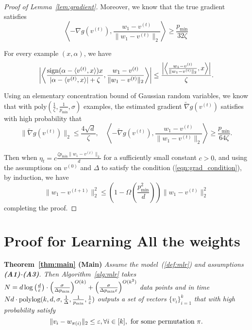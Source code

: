\begin{proof}[Proof of Lemma~\ref{lem:gradient}]
Moreover, we know that the true gradient satisfies
$$
  \left\langle - \nabla g(v^{(t)}) , \frac{ w_1 - v^{(t)}}{\| w_1 - v^{(t)}\|_2}  \right\rangle \geq \frac{p_{\min}}{32 \zeta} 
$$

For every example $(x, \alpha)$, we have
$$
  \left|\left\langle  \frac{\operatorname*{sign}(\alpha - \langle v^{(t)}, x \rangle) x }{|\alpha -  \langle v^{(t)}, x \rangle| + \zeta}   , \frac{ w_1 - v^{(t)}}{\| w_1 - v^{(t)}\|_2} \right\rangle \right|
	\leq 
	\frac{\left|\left\langle\frac{ w_1 - v^{(t)}}{\| w_1 - v^{(t)}\|_2}, x  \right\rangle\right|}{\zeta}.
$$

Using an elementary concentration bound of Gaussian random variables, we know that with $\text{poly}\left(\frac{1}{\zeta}, \frac{1}{p_{\min}}, \sigma\right)$ examples, the estimated gradient $\tilde{\nabla} g(v^{(t)})$ satisfies with high probability that
$$
  \| \tilde{\nabla } g(v^{(t)}) \|_2 \leq \frac{4 \sqrt{d}}{\zeta}, 
	\quad 
	\left\langle -\tilde{ \nabla} g(v^{(t)}) , \frac{ w_1 - v^{(t)}}{\| w_1 - v^{(t)}\|_2}  \right\rangle \geq \frac{p_{\min}}{64 \zeta}.
$$ 


Then when $\eta_t = c\frac{\zeta p_{\min} \| w_1 - v^{(t)}\|_2}{ d}$ for a sufficiently small constant $c>0$, and using the assumptions on $v^{(0)}$ and $\Delta$ to satisfy the condition (\ref{eqn:grad_condition}), by induction, we have
$$
 \| w_1 - v^{(t + 1)}\|_2^2 \leq \left( 1 - \Omega\left( \frac{p_{\min}^2}{ d} \right)\right) \| w_1 - v^{(t)} \|_2^2
$$
completing the proof.
\end{proof}

\section{Proof for Learning All the weights} \label{sec:proof_all}

\noindent
\textbf{Theorem~\ref{thm:main} (Main)} 
{\it
Assume the model~(\ref{def:mlr}) and assumptions \textbf{(A1)}-\textbf{(A3)}. Then Algorithm~\ref{alg:mlr} takes $N=d \log\left(\frac{d}{\varepsilon}\right)\cdot \left(\frac{\sigma}{\Delta p_{\min}} \right)^{O(k)} +  \left( \frac{\sigma }{\Delta p_{\min} \varepsilon} \right)^{O(k^2)}$ data points and in time $Nd \cdot \textrm{polylog}(k, d, \sigma, \frac{1}{\Delta}, \frac{1}{p_{\min}}, \frac{1}{\varepsilon}) $  outputs a set of vectors $\{v_i\}_{i=1}^k$ that with high probability satisfy
$$
  \|v_i  - w_{\pi(i)} \|_2 \le \varepsilon, \forall i \in [k], ~\mbox{for some permutation $\pi$}.
$$  
}


